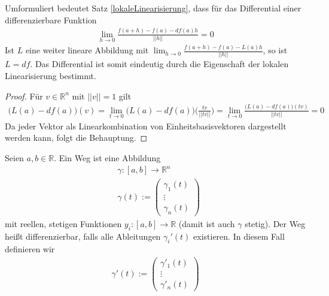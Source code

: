 \begin{Bemerkung}
\label{differentialeindeutig}
Umformuliert bedeutet Satz \ref{lokaleLinearisierung}, dass für das Differential einer differenzierbare Funktion
\begin{align}
\lim_{h \to 0} \frac{f(a + h) -f(a) - df(a) h }{||h||} = 0
\end{align}
Ist $L$ eine weiter lineare Abbildung mit $\lim_{h \to 0} \frac{f(a + h) -f(a) - L(a) h }{||h||}$, so ist $L = df$. Das Differential ist somit eindeutig durch die Eigenschaft der lokalen Linearisierung bestimmt.
\end{Bemerkung}
\begin{proof}
Für $v \in \mathbb{R}^n$ mit $||v|| = 1$ gilt 
\begin {align*}
\bigl( L(a) - df(a) \bigr)(v) =  \lim_{t \to 0}  \bigl( L(a) - df(a) \bigr) \bigl( \frac{tv}{||tv||} \bigr) = \lim_{t \to 0} \frac{\bigl( L(a) - df(a) \bigr)(tv) }{||tv||} = 0
\end{align*}
Da jeder Vektor als Linearkombination von Einheitsbasisvektoren dargestellt werden kann, folgt die Behauptung.
\end{proof}

\begin{Definition}
Seien $a,b \in \mathbb{R}$. Ein Weg ist eine Abbildung  
\begin{align*}
& \gamma:  [a,b] \to \mathbb{R}^n \\
& \gamma (t) :=  \begin{pmatrix} \gamma_1(t) \\ \vdots \\ \gamma_n(t) \end{pmatrix}
\end{align*}
mit reellen, stetigen Funktionen $y_i : [a,b] \to \mathbb{R}$ (damit ist auch $\gamma$ stetig). Der Weg heißt differenzierbar, falls alle Ableitungen $\gamma_i'(t)$ existieren. In diesem Fall definieren wir
\begin{align*}
 \gamma' (t) :=  \begin{pmatrix} \gamma'_1(t) \\ \vdots \\ \gamma'_n(t) \end{pmatrix}
\end{align*}
\end{Definition}


